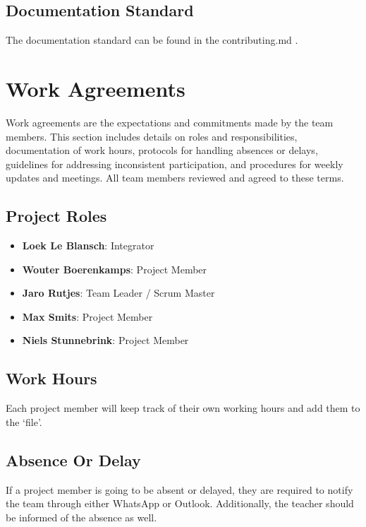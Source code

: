 \documentclass{projdoc}
\begin{document}
\subsection{Documentation Standard}
The documentation standard can be found in the contributing.md \autocite{crepe:docs-standard}.


\section{Work Agreements}
Work agreements are the expectations and commitments made by the team members. 
This section includes details on roles and responsibilities, documentation of 
work hours, protocols for handling absences or delays, guidelines for addressing inconsistent participation, and procedures for weekly updates and meetings. All team members reviewed and agreed to these terms.

\subsection{Project Roles}
\begin{itemize}
	\item \textbf{Loek Le Blansch}: Integrator
	\item \textbf{Wouter Boerenkamps}: Project Member
	\item \textbf{Jaro Rutjes}: Team Leader / Scrum Master
	\item \textbf{Max Smits}: Project Member
	\item \textbf{Niels Stunnebrink}: Project Member
\end{itemize}

\subsection{Work Hours}
Each project member will keep track of their own working hours and add them to the `file'.

\subsection{Absence Or Delay}
If a project member is going to be absent or delayed, they are required to 
notify the team through either WhatsApp or Outlook. Additionally, the teacher 
should be informed of the absence as well.
\end{document}
